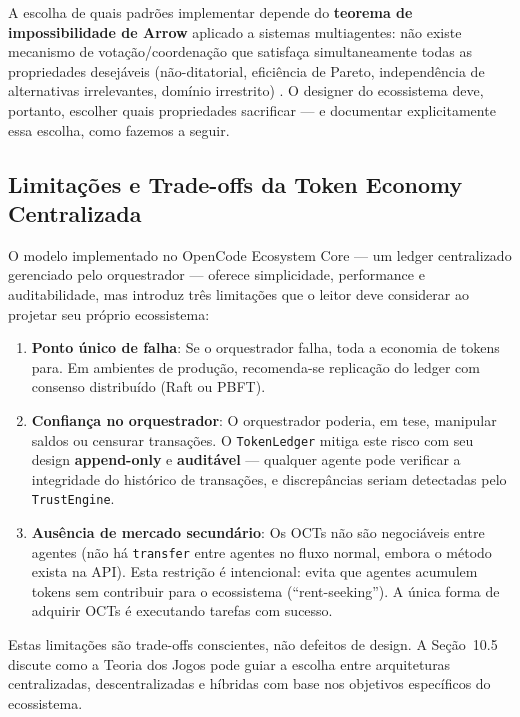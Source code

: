 A escolha de quais padrões implementar depende do \textbf{teorema de impossibilidade de Arrow} aplicado a sistemas multiagentes: não existe mecanismo de votação/coordenação que satisfaça simultaneamente todas as propriedades desejáveis (não-ditatorial, eficiência de Pareto, independência de alternativas irrelevantes, domínio irrestrito) \cite{arrow1951social}. O designer do ecossistema deve, portanto, escolher quais propriedades sacrificar --- e documentar explicitamente essa escolha, como fazemos a seguir.

\subsection{Limitações e Trade-offs da Token Economy Centralizada}

O modelo implementado no OpenCode Ecosystem Core --- um ledger centralizado gerenciado pelo orquestrador --- oferece simplicidade, performance e auditabilidade, mas introduz três limitações que o leitor deve considerar ao projetar seu próprio ecossistema:

\begin{enumerate}
    \item \textbf{Ponto único de falha}: Se o orquestrador falha, toda a economia de tokens para. Em ambientes de produção, recomenda-se replicação do ledger com consenso distribuído (Raft ou PBFT).
    
    \item \textbf{Confiança no orquestrador}: O orquestrador poderia, em tese, manipular saldos ou censurar transações. O \texttt{TokenLedger} mitiga este risco com seu design \textbf{append-only} e \textbf{auditável} --- qualquer agente pode verificar a integridade do histórico de transações, e discrepâncias seriam detectadas pelo \texttt{TrustEngine}.
    
    \item \textbf{Ausência de mercado secundário}: Os OCTs não são negociáveis entre agentes (não há \texttt{transfer} entre agentes no fluxo normal, embora o método exista na API). Esta restrição é intencional: evita que agentes acumulem tokens sem contribuir para o ecossistema (``rent-seeking''). A única forma de adquirir OCTs é executando tarefas com sucesso.
\end{enumerate}

Estas limitações são trade-offs conscientes, não defeitos de design. A Seção~10.5 discute como a Teoria dos Jogos pode guiar a escolha entre arquiteturas centralizadas, descentralizadas e híbridas com base nos objetivos específicos do ecossistema.

